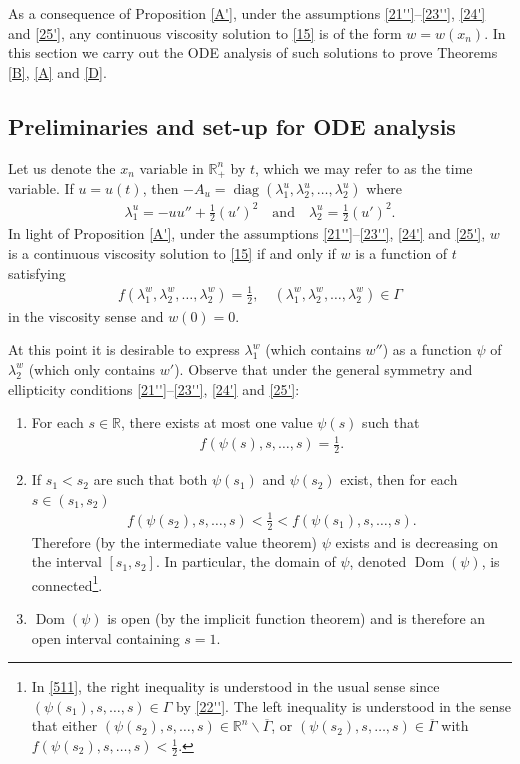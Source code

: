 \documentclass[12pt]{article}
\numberwithin{equation}{section}
\theoremstyle{plain}
\theoremstyle{definition}
\begin{document}
As a consequence of Proposition \ref{A'}, under the assumptions \eqref{21''}--\eqref{23''}, \eqref{24'} and \eqref{25'}, any continuous viscosity solution to \eqref{15} is of the form $w=w(x_n)$. In this section we carry out the ODE analysis of such solutions to prove Theorems \ref{B}, \ref{A} and \ref{D}. 

\subsection{Preliminaries and set-up for ODE analysis}




Let us denote the $x_n$ variable in $\mathbb{R}^n_+$ by $t$, which we may refer to as the time variable. If $u=u(t)$, then $-A_u = \operatorname{diag}(\lambda_1^u, \lambda_2^u, \dots,\lambda_2^u)$ where
\begin{align*}
\lambda_1^u = -u u'' + \frac{1}{2}(u')^2 \quad \text{and} \quad \lambda_2^u = \frac{1}{2}(u')^2.
\end{align*}
In light of Proposition \ref{A'}, under the assumptions \eqref{21''}--\eqref{23''}, \eqref{24'} and \eqref{25'}, $w$ is a continuous viscosity solution to \eqref{15} if and only if $w$ is a function of $t$ satisfying
\begin{align}\label{1}
f(\lambda_1^w,\lambda_2^w,\dots,\lambda_2^w) = \frac{1}{2}, \quad (\lambda_1^w,\lambda_2^w,\dots,\lambda_2^w)\in\Gamma
\end{align}
in the viscosity sense and $w(0) = 0$.\medskip 

At this point it is desirable to express $\lambda_1^w$ (which contains $w''$) as a function $\psi$ of $\lambda_2^w$ (which only contains $w'$). Observe that under the general symmetry and ellipticity conditions \eqref{21''}--\eqref{23''}, \eqref{24'} and \eqref{25'}: \smallskip
\begin{enumerate}[$\bullet$]
	\item For each $s\in\mathbb{R}$, there exists at most one value $\psi(s)$ such that \begin{align*}
	f(\psi(s),s,\dots,s)=\frac{1}{2}. 
	\end{align*} 
	\item If $s_1<s_2$ are such that both $\psi(s_1)$ and $\psi(s_2)$ exist, then for each $s\in(s_1,s_2)$
	\begin{align}\label{511}
	f(\psi(s_2),s,\dots,s)<\frac{1}{2}<f(\psi(s_1), s, \dots, s).
	\end{align}
	Therefore (by the intermediate value theorem) $\psi$ exists and is decreasing on the interval $[s_1,s_2]$. In particular, the domain of $\psi$, denoted $\operatorname{Dom}(\psi)$, is connected\footnote{In \eqref{511}, the right inequality is understood in the usual sense since $(\psi(s_1),s,\dots,s)\in\Gamma$ by \eqref{22''}. The left inequality is understood in the sense that either $(\psi(s_2), s,\dots,s)\in\mathbb{R}^n\backslash\overline{\Gamma}$, or $(\psi(s_2), s,\dots,s)\in\overline{\Gamma}$ with $f(\psi(s_2), s, \dots, s)<\frac{1}{2}$.}.\smallskip
	\item $\operatorname{Dom}(\psi)$ is open (by the implicit function theorem) and is therefore an open interval containing $s=1$.\medskip
\end{enumerate}
\end{document}
